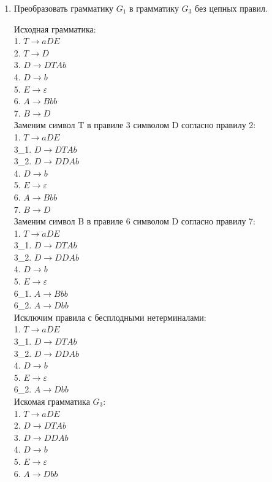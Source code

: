 \documentclass[a4paper,14pt]{extarticle}
\begin{document}
\begin{enumerate}[1.]
\item Преобразовать грамматику $G_1$ в грамматику $G_3$ без цепных правил.

Исходная грамматика:\\
1. $T \rightarrow aDE$\\
2. $T \rightarrow D$\\
3. $D \rightarrow DTAb$\\
4. $D \rightarrow b$\\
5. $E \rightarrow \varepsilon$\\
6. $A \rightarrow Bbb$\\
7. $B \rightarrow D$\\

Заменим символ T в правиле 3 символом D согласно правилу 2:\\
1. $T \rightarrow aDE$\\
3\_1. $D \rightarrow DTAb$\\
3\_2. $D \rightarrow DDAb$\\
4. $D \rightarrow b$\\
5. $E \rightarrow \varepsilon$\\
6. $A \rightarrow Bbb$\\
7. $B \rightarrow D$\\

Заменим символ B в правиле 6 символом D согласно правилу 7:\\
1. $T \rightarrow aDE$\\
3\_1. $D \rightarrow DTAb$\\
3\_2. $D \rightarrow DDAb$\\
4. $D \rightarrow b$\\
5. $E \rightarrow \varepsilon$\\
6\_1. $A \rightarrow Bbb$\\
6\_2. $A \rightarrow Dbb$\\

Исключим правила с бесплодными нетерминалами:\\
1. $T \rightarrow aDE$\\
3\_1. $D \rightarrow DTAb$\\
3\_2. $D \rightarrow DDAb$\\
4. $D \rightarrow b$\\
5. $E \rightarrow \varepsilon$\\
6\_2. $A \rightarrow Dbb$\\

Искомая грамматика $G_3$:\\
1. $T \rightarrow aDE$\\
2. $D \rightarrow DTAb$\\
3. $D \rightarrow DDAb$\\
4. $D \rightarrow b$\\
5. $E \rightarrow \varepsilon$\\
6. $A \rightarrow Dbb$\\


\end{enumerate}
\end{document}
